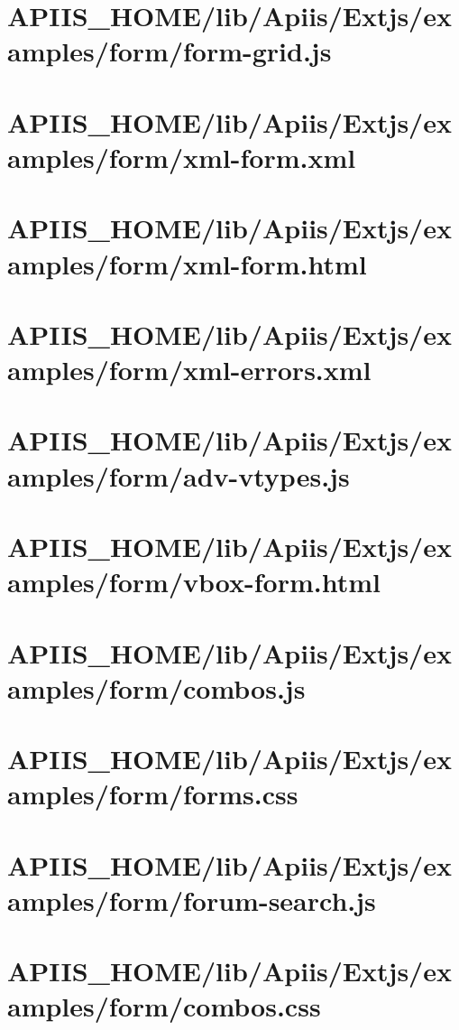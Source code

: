 \section{APIIS\_HOME/lib/Apiis/Extjs/examples/form/form-grid.js} 
\section{APIIS\_HOME/lib/Apiis/Extjs/examples/form/xml-form.xml} 
\section{APIIS\_HOME/lib/Apiis/Extjs/examples/form/xml-form.html} 
\section{APIIS\_HOME/lib/Apiis/Extjs/examples/form/xml-errors.xml} 
\section{APIIS\_HOME/lib/Apiis/Extjs/examples/form/adv-vtypes.js} 
\section{APIIS\_HOME/lib/Apiis/Extjs/examples/form/vbox-form.html} 
\section{APIIS\_HOME/lib/Apiis/Extjs/examples/form/combos.js} 
\section{APIIS\_HOME/lib/Apiis/Extjs/examples/form/forms.css} 
\section{APIIS\_HOME/lib/Apiis/Extjs/examples/form/forum-search.js} 
\section{APIIS\_HOME/lib/Apiis/Extjs/examples/form/combos.css} 
